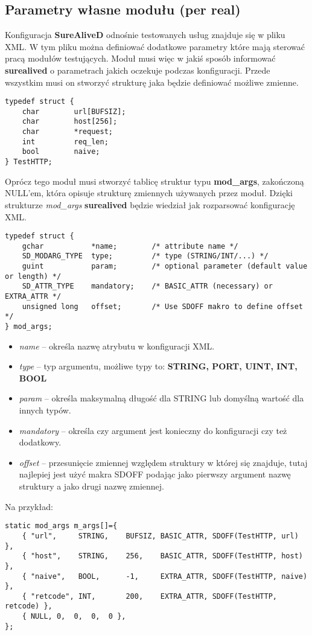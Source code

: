 \documentclass[polish,12pt]{article}
\begin{document}
\subsection{Parametry własne modułu (per real)}
Konfiguracja \textbf{SureAliveD} odnośnie testowanych usług znajduje się w pliku XML.
W tym pliku można definiować dodatkowe parametry które mają sterować pracą modułów testujących.
Moduł musi więc w jakiś sposób informować \textbf{surealived} o parametrach jakich oczekuje
podczas konfiguracji. Przede wszystkim musi on stworzyć strukturę jaka będzie definiować
możliwe zmienne.
{\small
\begin{verbatim}
typedef struct {
    char        url[BUFSIZ];
    char        host[256];
    char        *request;
    int         req_len;
    bool        naive;
} TestHTTP;
\end{verbatim}
}
\newpage
Oprócz tego moduł musi stworzyć tablicę struktur typu \textbf{mod\_args}, zakończoną NULL'em,
która opisuje strukturę zmiennych używanych przez moduł. Dzięki strukturze \textit{mod\_args}
\textbf{surealived} będzie wiedział jak rozparsować konfigurację XML.
{\small
\begin{verbatim}
typedef struct {
    gchar           *name;        /* attribute name */
    SD_MODARG_TYPE  type;         /* type (STRING/INT/...) */
    guint           param;        /* optional parameter (default value or length) */
    SD_ATTR_TYPE    mandatory;    /* BASIC_ATTR (necessary) or EXTRA_ATTR */
    unsigned long   offset;       /* Use SDOFF makro to define offset */
} mod_args;
\end{verbatim}
}
\begin{itemize}
  \item \textit{name} -- określa nazwę atrybutu w konfiguracji XML.
  \item \textit{type} -- typ argumentu, możliwe typy to: \textbf{STRING, PORT, UINT, INT, BOOL}
  \item \textit{param} -- określa maksymalną długość dla STRING lub domyślną wartość dla innych typów.
  \item \textit{mandatory} -- określa czy argument jest konieczny do konfiguracji czy też dodatkowy.
  \item \textit{offset} -- przesunięcie zmiennej względem struktury w której się znajduje, tutaj najlepiej
    jest użyć makra SDOFF podając jako pierwszy argument nazwę struktury a jako drugi nazwę zmiennej.
\end{itemize}
Na przykład:
{\small
\begin{verbatim}
static mod_args m_args[]={
    { "url",     STRING,    BUFSIZ, BASIC_ATTR, SDOFF(TestHTTP, url)     },
    { "host",    STRING,    256,    BASIC_ATTR, SDOFF(TestHTTP, host)    },
    { "naive",   BOOL,      -1,     EXTRA_ATTR, SDOFF(TestHTTP, naive)   },
    { "retcode", INT,       200,    EXTRA_ATTR, SDOFF(TestHTTP, retcode) },
    { NULL, 0,  0,  0,  0 },
};
\end{verbatim}
}
\end{document}
